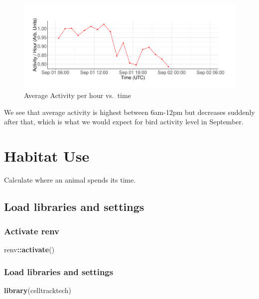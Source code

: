 \documentclass[
]{book}
\newenvironment{Shaded}{\begin{snugshade}}{\end{snugshade}}
\newcommand{\FunctionTok}[1]{\textcolor[rgb]{0.13,0.29,0.53}{\textbf{#1}}}
\newcommand{\NormalTok}[1]{#1}
\newcommand{\SpecialCharTok}[1]{\textcolor[rgb]{0.81,0.36,0.00}{\textbf{#1}}}
\begin{document}
\begin{figure}
\centering
\includegraphics{images/activity_level_average_activity_per_hour_vs_time.png}
\caption{Average Activity per hour vs.~time}
\end{figure}

We see that average activity is highest between 6am-12pm but decreases suddenly after that, which is what we would expect for bird activity level in September.

\chapter{Habitat Use}\label{habitat-use}

Calculate where an animal spends its time.

\section{Load libraries and settings}\label{load-libraries-and-settings}

\subsection{Activate renv}\label{activate-renv}

\begin{Shaded}
\begin{Highlighting}[]
\NormalTok{renv}\SpecialCharTok{::}\FunctionTok{activate}\NormalTok{()}
\end{Highlighting}
\end{Shaded}

\subsection{Load libraries and settings}\label{load-libraries-and-settings-1}

\begin{Shaded}
\begin{Highlighting}[]
\FunctionTok{library}\NormalTok{(celltracktech)}
\end{Highlighting}
\end{Shaded}
\end{document}
